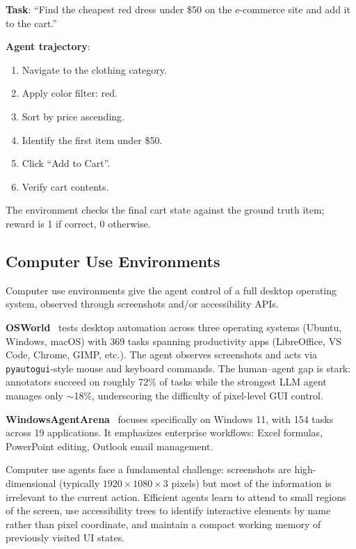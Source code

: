 \begin{examplebox}
\textbf{Task}: ``Find the cheapest red dress under \$50 on the e-commerce site and add it to the cart.''

\textbf{Agent trajectory}:

\begin{enumerate}
  \item Navigate to the clothing category.
  \item Apply color filter: red.
  \item Sort by price ascending.
  \item Identify the first item under \$50.
  \item Click ``Add to Cart''.
  \item Verify cart contents.
\end{enumerate}

The environment checks the final cart state against the ground truth item; reward is 1 if correct, 0 otherwise.
\end{examplebox}

\subsection{Computer Use Environments}
\label{computer-use-environments}

Computer use environments give the agent control of a full desktop operating system, observed through screenshots and/or accessibility APIs.

\textbf{OSWorld}~\cite{xie2024osworld} tests desktop automation across three operating systems (Ubuntu, Windows, macOS) with 369 tasks spanning productivity apps (LibreOffice, VS Code, Chrome, GIMP, etc.). The agent observes screenshots and acts via \texttt{pyautogui}-style mouse and keyboard commands. The human--agent gap is stark: annotators succeed on roughly 72\% of tasks while the strongest LLM agent manages only $\sim$18\%, underscoring the difficulty of pixel-level GUI control.

\textbf{WindowsAgentArena}~\cite{bonatti2024windows} focuses specifically on Windows 11, with 154 tasks across 19 applications. It emphasizes enterprise workflows: Excel formulas, PowerPoint editing, Outlook email management.

\begin{keybox}
Computer use agents face a fundamental challenge: screenshots are high-dimensional (typically $1920 \times 1080 \times 3$ pixels) but most of the information is irrelevant to the current action. Efficient agents learn to attend to small regions of the screen, use accessibility trees to identify interactive elements by name rather than pixel coordinate, and maintain a compact working memory of previously visited UI states.
\end{keybox}

